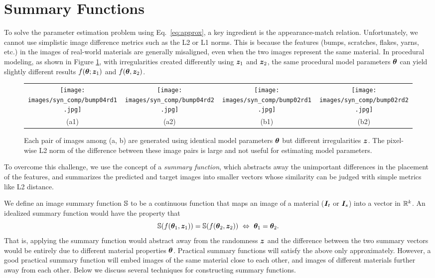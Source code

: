 \section{Summary Functions}
\label{sec:summary_func}

To solve the parameter estimation problem using Eq.~\eqref{eq:approx}, a key ingredient is the appearance-match relation.
Unfortunately, we cannot use simplistic image difference metrics such as the L2 or L1 norms.
This is because the features (bumps, scratches, flakes, yarns, etc.) in the images of real-world materials are generally misaligned, even when the two images represent the same material.
In procedural modeling, as shown in Figure \ref{fig:syn1}, with irregularities created differently using $\bm{z}_1$ and $\bm{z}_2$, the same procedural model parameters $\bm{\theta}$ can yield slightly different results $f(\bm{\theta}; \bm{z}_1)$ and $f(\bm{\theta}, \bm{z}_2)$.

\begin{figure}[t]
	\addtolength{\tabcolsep}{-5pt}
	\begin{tabular}{cccc}
		\texttt{[image: images/syn\_comp/bump04rd1.jpg]} &
		\texttt{[image: images/syn\_comp/bump04rd2.jpg]} &
		\texttt{[image: images/syn\_comp/bump02rd1.jpg]} &
		\texttt{[image: images/syn\_comp/bump02rd2.jpg]} \\
		(a1) & (a2) & (b1) & (b2)
	\end{tabular}
	\caption{\label{fig:syn1}
		Each pair of images among (a, b) are generated using identical model parameters $\bm{\theta}$ but different irregularities $\bm{z}$. The pixel-wise L2 norm of the difference between these image pairs is large and not useful for estimating model parameters.
	}
\end{figure}

To overcome this challenge, we use the concept of a \emph{summary function}, which abstracts away the unimportant differences in the placement of the features, and summarizes the predicted and target images into smaller vectors whose similarity can be judged with simple metrics like L2 distance.

We define an image summary function $\mathbb{S}$ to be a continuous function that maps an image of a material ($\bm{I}_t$ or $\bm{I}_s$) into a vector in $\mathbb{R}^k$. An idealized summary function would have the property that
%
\begin{equation}
	\mathbb{S}(f(\bm{\theta}_1, \bm{z}_1)) = \mathbb{S}(f(\bm{\theta}_2, \bm{z}_2)) \ \Leftrightarrow \ \bm{\theta}_1 = \bm{\theta}_2.
\end{equation}
%
That is, applying the summary function would %
abstract away from the randomness $\bm{z}$ and the difference between the two summary vectors would be entirely due to different material properties $\bm{\theta}$. Practical summary functions will satisfy the above only approximately. However, a good practical summary function will embed images of the same material close to each other, and images of different materials further away from each other. Below we discuss several techniques for constructing summary functions.

